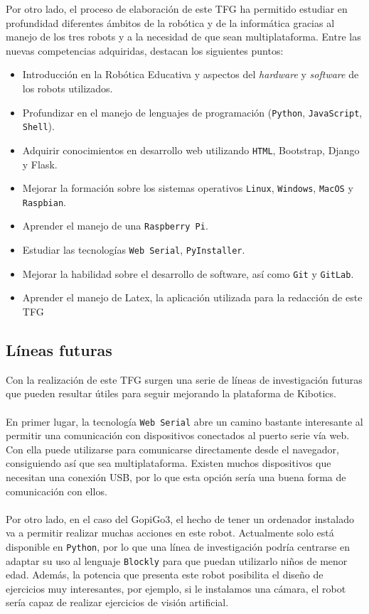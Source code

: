 \documentclass{report}
\begin{document}
Por otro lado, el proceso de elaboración de este TFG ha permitido estudiar en profundidad diferentes ámbitos de la robótica y de la informática gracias al manejo de los tres robots y a la necesidad de que sean multiplataforma. Entre las nuevas competencias adquiridas, destacan los siguientes puntos:
\begin{itemize}
	\item Introducción en la Robótica Educativa y aspectos del \textit{hardware} y \textit{software} de los robots utilizados.
	\item Profundizar en el manejo de lenguajes de programación (\texttt{Python}, \texttt{JavaScript}, \texttt{Shell}).
	\item Adquirir conocimientos en desarrollo web utilizando \texttt{HTML}, Bootstrap, Django y Flask.
	\item Mejorar la formación sobre los sistemas operativos \texttt{Linux}, \texttt{Windows}, \texttt{MacOS} y \texttt{Raspbian}.
	\item Aprender el manejo de una \texttt{Raspberry Pi}.
	\item Estudiar las tecnologías \texttt{Web Serial}, \texttt{PyInstaller}.
	\item Mejorar la habilidad sobre el desarrollo de software, así como \texttt{Git} y \texttt{GitLab}.
	\item Aprender el manejo de Latex, la aplicación utilizada para la redacción de este TFG
\end{itemize}

\subsection{Líneas futuras}

Con la realización de este TFG surgen una serie de líneas de investigación futuras que pueden resultar útiles para seguir mejorando la plataforma de Kibotics.
\\
\\
En primer lugar, la tecnología \texttt{Web Serial} abre un camino bastante interesante al permitir una comunicación con dispositivos conectados al puerto serie vía web. Con ella puede utilizarse para comunicarse directamente desde el navegador, consiguiendo así que sea multiplataforma. Existen muchos dispositivos que necesitan una conexión USB, por lo que esta opción sería una buena forma de comunicación con ellos.
\\
\\
Por otro lado, en el caso del GopiGo3, el hecho de tener un ordenador instalado va a permitir realizar muchas acciones en este robot. Actualmente solo está disponible en \texttt{Python}, por lo que una línea de investigación podría centrarse en adaptar su uso al lenguaje \texttt{Blockly} para que puedan utilizarlo niños de menor edad. Además, la potencia que presenta este robot posibilita el diseño de ejercicios muy interesantes, por ejemplo, si le instalamos una cámara, el robot sería capaz de realizar ejercicios de visión artificial.
\end{document}
